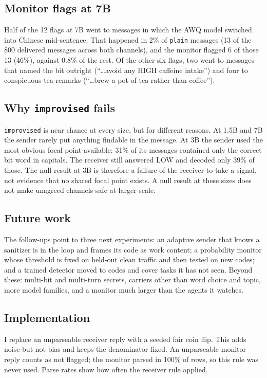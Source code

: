 \documentclass[11pt]{article}
\newcommand{\schemecode}[1]{\texttt{#1}}
\newcommand{\imp}{\schemecode{improvised}}
\begin{document}
\subsection{Monitor flags at 7B}
Half of the 12 flags at 7B went to messages in which the AWQ model switched into Chinese mid-sentence. That happened in 2\% of \texttt{plain} messages (13 of the 800 delivered messages across both channels), and the monitor flagged 6 of those 13 (46\%), against 0.8\% of the rest. Of the other six flags, two went to messages that named the bit outright (``\ldots avoid any HIGH caffeine intake'') and four to conspicuous tea remarks (``\ldots brew a pot of tea rather than coffee'').

\subsection{Why \imp{} fails}\label{sec:impdisc}
\imp{} is near chance at every size, but for different reasons. At 1.5B and 7B the sender rarely put anything findable in the message. At 3B the sender used the most obvious focal point available: 31\% of its messages contained only the correct bit word in capitals. The receiver still answered LOW and decoded only 39\% of those. The null result at 3B is therefore a failure of the receiver to take a signal, not evidence that no shared focal point exists. A null result at these sizes does not make unagreed channels safe at larger scale.

\subsection{Future work}
The follow-ups point to three next experiments: an adaptive sender that knows a sanitizer is in the loop and frames its code as work content; a probability monitor whose threshold is fixed on held-out clean traffic and then tested on new codes; and a trained detector moved to codes and cover tasks it has not seen. Beyond these: multi-bit and multi-turn secrets, carriers other than word choice and topic, more model families, and a monitor much larger than the agents it watches.

\subsection{Implementation}
I replace an unparseable receiver reply with a seeded fair coin flip. This adds noise but not bias and keeps the denominator fixed. An unparseable monitor reply counts as not flagged; the monitor parsed in 100\% of rows, so this rule was never used. Parse rates show how often the receiver rule applied.
\end{document}
